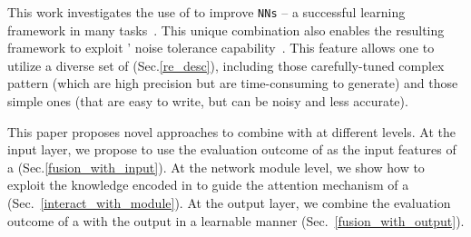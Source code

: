 This work investigates the use of \REs to improve \texttt{NNs} -- a successful learning framework in many \NLP
tasks~\cite{goldberg2017neural}. This unique combination also enables the resulting framework to exploit \NNs' noise tolerance
capability~\cite{xie2016disturblabel}. This feature allows one to utilize a diverse set of \REs (Sec.\ref{re_desc}), including those
carefully-tuned complex pattern (which are high precision but are time-consuming to generate) and those simple ones (that are easy to
write, but can be noisy and less accurate).





This paper proposes novel approaches to combine \REs with \NNs at different levels.  At the input layer, we propose to use the evaluation
outcome of \REs as the input features of a \NN (Sec.\ref{fusion_with_input}).
At the network module level, we show how to
exploit the knowledge encoded in \REs to guide the attention mechanism of a \NN (Sec.~\ref{interact_with_module}). At the output layer, we
combine the evaluation outcome of a \RE with the \NN output in a learnable manner (Sec.~\ref{fusion_with_output}).

